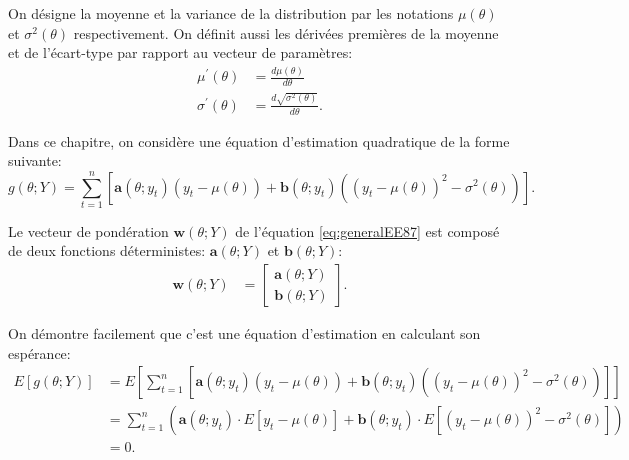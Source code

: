 On désigne la moyenne et la variance de la distribution par les
notations $\mu\left(\theta\right)$ et $\sigma^2(\theta)$
respectivement.  On définit aussi les dérivées premières de la moyenne
et de l'écart-type par rapport au vecteur de paramètres:
\begin{subequations}\label{eq:derivmom}
  \begin{align}
    \mu^{\prime}\left( \theta \right) &= \frac{d \mu\left(\theta\right)}{d\theta} \label{eq:derivmom1}\\
    \sigma^{\prime}\left( \theta \right) &= \frac{d
      \sqrt{\sigma^2(\theta)}}{d\theta}.\label{eq:derivmom2}
  \end{align}
\end{subequations}

Dans ce chapitre, on considère une équation d'estimation quadratique
de la forme suivante:
\begin{equation}
  \label{eq:generalquad}
  g\left(\theta;Y \right) = \sum_{t=1}^n \left[ \mathbf{a}(\theta;y_t)(y_t-\mu\left(\theta\right)) + \mathbf{b}(\theta;y_t)\left((y_t-\mu\left(\theta\right))^2-\sigma^2\left(\theta\right) \right)\right].
\end{equation}

Le vecteur de pondération $\mathbf{w}(\theta;Y)$ de l'équation
\eqref{eq:generalEE87} est composé de deux fonctions déterministes:
$\mathbf{a}(\theta;Y)$ et $\mathbf{b}(\theta;Y)$:
\begin{align}
  \label{eq:vecteuroptimal.ab}
  \mathbf{w}(\theta;Y) &= \begin{bmatrix} \mathbf{a}(\theta;Y) \\
    \mathbf{b}(\theta;Y) \end{bmatrix}.
\end{align}

On démontre facilement que c'est une équation d'estimation en
calculant son espérance:
\begin{align}
  \label{eq:demogeneralquad-convergent}
  E\left[g\left(\theta;Y \right)\right] &= E\left[ \sum_{t=1}^n \left[ \mathbf{a}(\theta;y_t)(y_t-\mu\left(\theta\right)) + \mathbf{b}(\theta;y_t)\left((y_t-\mu\left(\theta\right))^2-\sigma^2\left(\theta\right) \right)\right]\right] \nonumber\\
  &=  \sum_{t=1}^n \left( \mathbf{a}(\theta;y_t)\cdot  E\left[y_t-\mu\left(\theta\right)\right] + \mathbf{b}(\theta;y_t)\cdot E\left[(y_t-\mu\left(\theta\right))^2-\sigma^2\left(\theta\right) \right]\right) \nonumber\\
  &= 0.
\end{align}

